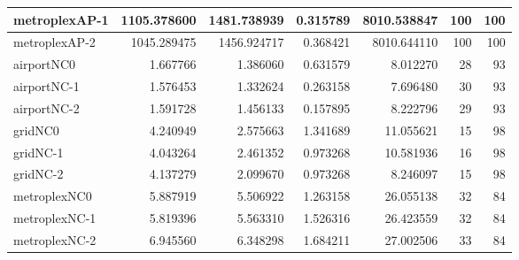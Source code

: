 \begin{longtable}{|l|r|r|r|r|r|r|}
metroplexAP-1 & 1105.378600 & 1481.738939 & 0.315789 & 8010.538847 & 100 & 100 \\ \hline
metroplexAP-2 & 1045.289475 & 1456.924717 & 0.368421 & 8010.644110 & 100 & 100 \\ \hline
airportNC0 & 1.667766 & 1.386060 & 0.631579 & 8.012270 & 28 & 93 \\ \hline
airportNC-1 & 1.576453 & 1.332624 & 0.263158 & 7.696480 & 30 & 93 \\ \hline
airportNC-2 & 1.591728 & 1.456133 & 0.157895 & 8.222796 & 29 & 93 \\ \hline
gridNC0 & 4.240949 & 2.575663 & 1.341689 & 11.055621 & 15 & 98 \\ \hline
gridNC-1 & 4.043264 & 2.461352 & 0.973268 & 10.581936 & 16 & 98 \\ \hline
gridNC-2 & 4.137279 & 2.099670 & 0.973268 & 8.246097 & 15 & 98 \\ \hline
metroplexNC0 & 5.887919 & 5.506922 & 1.263158 & 26.055138 & 32 & 84 \\ \hline
metroplexNC-1 & 5.819396 & 5.563310 & 1.526316 & 26.423559 & 32 & 84 \\ \hline
metroplexNC-2 & 6.945560 & 6.348298 & 1.684211 & 27.002506 & 33 & 84 \\ \hline
\end{longtable}
